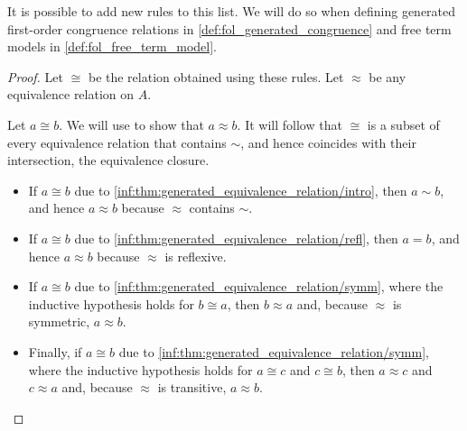 \begin{comments}
  \item It is possible to add new rules to this list. We will do so when defining generated first-order congruence relations in \cref{def:fol_generated_congruence} and free term models in \cref{def:fol_free_term_model}.
\end{comments}
\begin{proof}
  Let \( {\cong} \) be the relation obtained using these rules. Let \( {\approx} \) be any equivalence relation on \( A \).

  Let \( a \cong b \). We will use  to show that \( a \approx b \). It will follow that \( {\cong} \) is a subset of every equivalence relation that contains \( {\sim} \), and hence coincides with their intersection, the equivalence closure.
  \begin{itemize}
    \item If \( a \cong b \) due to \ref{inf:thm:generated_equivalence_relation/intro}, then \( a \sim b \), and hence \( a \approx b \) because \( {\approx} \) contains \( {\sim} \).

    \item If \( a \cong b \) due to \ref{inf:thm:generated_equivalence_relation/refl}, then \( a = b \), and hence \( a \approx b \) because \( {\approx} \) is reflexive.

    \item If \( a \cong b \) due to \ref{inf:thm:generated_equivalence_relation/symm}, where the inductive hypothesis holds for \( b \cong a \), then \( b \approx a \) and, because \( {\approx} \) is symmetric, \( a \approx b \).

    \item Finally, if \( a \cong b \) due to \ref{inf:thm:generated_equivalence_relation/symm}, where the inductive hypothesis holds for \( a \cong c \) and \( c \cong b \), then \( a \approx c \) and \( c \approx a \) and, because \( {\approx} \) is transitive, \( a \approx b \).
  \end{itemize}
\end{proof}

